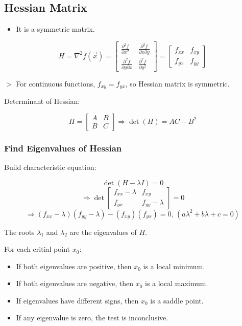 \documentclass[12pt,a4paper]{article}
\newcommand{\remark}[1]{
    $>$ {\color{blue} #1}
}
\begin{document}
\subsection*{Hessian Matrix}

\begin{itemize}
    \item It is a symmetric matrix.
\end{itemize}

\[
H = 
\nabla^2 f(\vec{x}) = 
\begin{bmatrix}
    \frac{\partial^2 f}{\partial x^2} & \frac{\partial^2 f}{\partial x \partial y} \\
    \frac{\partial^2 f}{\partial y \partial x} & \frac{\partial^2 f}{\partial y^2}
\end{bmatrix} = 
\begin{bmatrix} f_{xx} & f_{xy} \\ f_{yx} & f_{yy} \end{bmatrix}
\]

\remark{For continuous functions, $f_{xy} = f_{yx}$, so Hessian matrix is symmetric.}

Determinant of Hessian:

\[
H = \begin{bmatrix} A & B \\ B & C \end{bmatrix}
\Rightarrow \det(H) = AC - B^2
\]

\subsubsection*{Find Eigenvalues of Hessian}

Build characteristic equation:

\[\det(H - \lambda I) = 0\]
\[\Rightarrow
\det
\begin{bmatrix}
    f_{xx} - \lambda & f_{xy} \\
    f_{yx} & f_{yy} - \lambda
\end{bmatrix} = 0
\]
\[\Rightarrow (f_{xx} - \lambda)(f_{yy} - \lambda) - (f_{xy})(f_{yx}) = 0 \text{, } (a\lambda^2 + b\lambda + c = 0)\]

The roots $\lambda_1$ and $\lambda_2$ are the eigenvalues of $H$.

For each critial point $x_0$:

\begin{itemize}
    \item If both eigenvalues are positive, then $x_0$ is a local minimum.
    \item If both eigenvalues are negative, then $x_0$ is a local maximum.
    \item If eigenvalues have different signs, then $x_0$ is a saddle point.
    \item If any eigenvalue is zero, the test is inconclusive.
\end{itemize}
\end{document}
